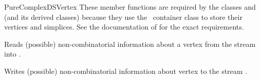 \begin{ccRefConcept}{PureComplexDSVertex}
These member functions are required by the classes
 and
 (and its derived classes) because they use
the \cgal\ container class  to store their vertices and
simplices. See the documentation of  for the exact
requirements.


{Reads (possible) non-combinatorial information about a vertex from the stream 
into .}

{Writes (possible) non-combinatorial information about vertex  to the stream
    .}

\ccSeeAlso

\\

\end{ccRefConcept}

